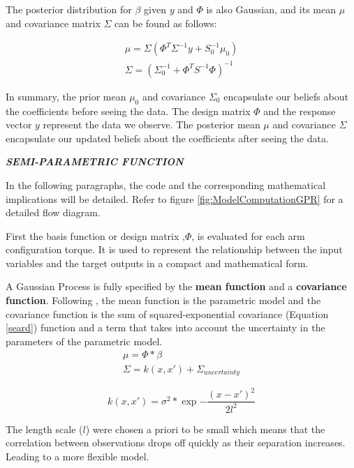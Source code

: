 The posterior distribution for \( \beta \) given \( y \) and \( \Phi \) is also Gaussian, and its mean \( \mu \) and covariance matrix \( \Sigma \) can be found as follows:

\begin{equation}
\begin{aligned}
     \mu = \Sigma (\Phi^T \Sigma^{-1} y + S_0^{-1} \mu_0) \\
    \Sigma = \left( \Sigma_0^{-1} + \Phi^T S^{-1} \Phi \right)^{-1}
\end{aligned}
\end{equation}

In summary, the prior mean \( \mu_0 \) and covariance \( \Sigma_0 \) encapsulate our beliefs about the coefficients before seeing the data. The design matrix \( \Phi \) and the response vector \( y \) represent the data we observe. The posterior mean \( \mu \) and covariance \( \Sigma \) encapsulate our updated beliefs about the coefficients after seeing the data.

\textbf{\textit{SEMI-PARAMETRIC FUNCTION}}

In the following paragraphs, the code and the corresponding mathematical implications will be detailed.  Refer to figure \ref{fig:ModelComputationGPR} for a detailed flow diagram.

First the basis function or design matrix ,$\Phi$, is evaluated for each arm configuration torque. It is used to represent the relationship between the input variables and the target outputs in a compact and mathematical form. 

A Gaussian Process is fully specified by the \textbf{mean function} and a \textbf{covariance function}. Following \cite{SPI}, the mean function is the parametric model and the covariance function is the sum of squared-exponential covariance (Equation \ref{seard})  function and a term that takes into account the uncertainty in the parameters of the parametric model. 
\begin{equation}
\begin{aligned}
    \mu = \Phi*\beta \\
    \Sigma = k(x,x')  + \Sigma_{uncertainty}
\end{aligned}
\end{equation}

\begin{equation}\label{seard}
    k(x,x') = \sigma^2*\exp{-\frac{(x-x')^2}{2l^2}}
\end{equation}

The length scale ($l$) were chosen a priori to be small which means that the correlation between observations drops off quickly as their separation increases. Leading to a more flexible model. 

